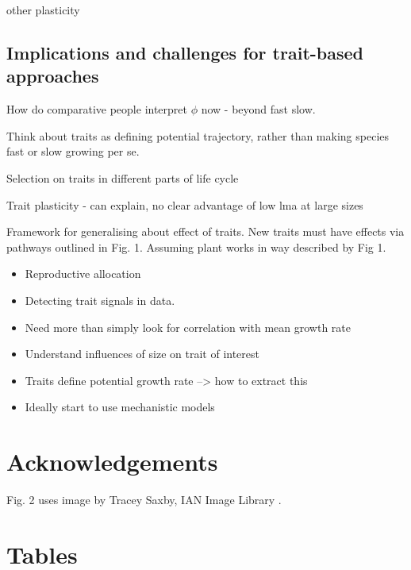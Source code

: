 \documentclass[a4paper,11pt]{article}
\begin{document}
other plasticity \citep{Thomas-2010}

\subsection{Implications and challenges for trait-based approaches}

How do comparative people interpret $\phi$ now - beyond fast slow.

Think about traits as defining potential trajectory, rather than making
species fast or slow growing per se.

Selection on traits in different parts of life cycle

Trait plasticity - can explain, no clear advantage of low lma at large
sizes

Framework for generalising about effect of traits. New traits must have effects via pathways outlined in Fig. 1. Assuming plant works in way described by Fig 1.

\begin{itemize}
\item Reproductive allocation
\item Detecting trait signals in data.
\item Need more than simply look for correlation with mean growth rate
\item Understand influences of size on trait of interest
\item Traits define potential growth rate --\textgreater{} how to extract
  this
\item Ideally start to use mechanistic models
\end{itemize}


\section{Acknowledgements}

Fig. 2 uses image by Tracey Saxby, IAN Image Library .

\newpage

\section{Tables}
\end{document}
